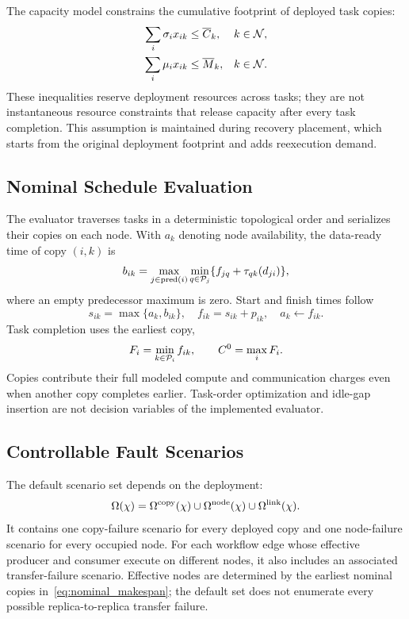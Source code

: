 The capacity model constrains the cumulative footprint of deployed task
copies:
\begin{align}
 \sum_i\sigma_i x_{ik}&\leq\overline C_k, & k&\in\mathcal{N},\\
 \sum_i\mu_i x_{ik}&\leq\overline M_k, & k&\in\mathcal{N}.
 \label{eq:capacity}
\end{align}
These inequalities reserve deployment resources across tasks; they are not
instantaneous resource constraints that release capacity after every task
completion. This assumption is maintained during recovery placement, which
starts from the original deployment footprint and adds reexecution demand.

\subsection{Nominal Schedule Evaluation}
The evaluator traverses tasks in a deterministic topological order and
serializes their copies on each node. With $a_k$ denoting node availability,
the data-ready time of copy $(i,k)$ is
\begin{equation}
 b_{ik}=\max_{j\in\operatorname{pred}(i)}\min_{q\in\mathcal{P}_{j}}
       \{f_{jq}+\tau_{qk}(d_{ji})\},
 \label{eq:data_ready}
\end{equation}
where an empty predecessor maximum is zero. Start and finish times follow
\begin{equation}
 s_{ik}=\max\{a_k,b_{ik}\},\quad f_{ik}=s_{ik}+p_{ik},\quad a_k\leftarrow f_{ik}.
 \label{eq:nominal_schedule}
\end{equation}
Task completion uses the earliest copy,
\begin{equation}
 F_i=\min_{k\in\mathcal{P}_{i}}f_{ik},\qquad C^{0}=\max_i F_i.
 \label{eq:nominal_makespan}
\end{equation}
Copies contribute their full modeled compute and communication charges even
when another copy completes earlier. Task-order optimization and idle-gap
insertion are not decision variables of the implemented evaluator.

\subsection{Controllable Fault Scenarios}
The default scenario set depends on the deployment:
\begin{equation}
 \Omega(\chi)=\Omega^{\mathrm{copy}}(\chi)\cup
 \Omega^{\mathrm{node}}(\chi)\cup\Omega^{\mathrm{link}}(\chi).
 \label{eq:fault_set}
\end{equation}
It contains one copy-failure scenario for every deployed copy and one
node-failure scenario for every occupied node. For each workflow edge whose
effective producer and consumer execute on different nodes, it also includes
an associated transfer-failure scenario. Effective nodes are determined by
the earliest nominal copies in~\eqref{eq:nominal_makespan}; the default set
does not enumerate every possible replica-to-replica transfer failure.

